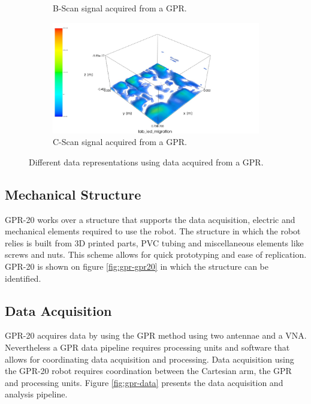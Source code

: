 \documentclass{article}
\begin{document}
\begin{figure}
\begin{subfigure}[b]{0.4\textwidth}
        \caption{B-Scan signal acquired from a GPR.}
        \label{fig:gpr-b-scan}
    \end{subfigure}
    \vfill
    \begin{subfigure}[b]{0.6\textwidth}
        \centering
        \includegraphics[width=\textwidth]{images/C_Scan_sample.jpeg}
        \caption{C-Scan signal acquired from a GPR.}
        \label{fig:gpr-c-scan}
    \end{subfigure}
    \caption{Different data representations using data acquired from a GPR.}
    \label{fig:gpr-scans}
\end{figure}


\subsection{Mechanical Structure}
GPR-20 works over a structure that supports the data acquisition, electric and mechanical elements required to use the robot. The structure in which the robot relies is built from 3D printed parts, PVC tubing and miscellaneous elements like screws and nuts. This scheme allows for quick prototyping and ease of replication. GPR-20 is shown on figure \ref{fig:gpr-gpr20} in which the structure can be identified. 


\subsection{Data Acquisition}
GPR-20 acquires data by using the GPR method using two antennae and a VNA. Nevertheless a GPR data pipeline requires processing units and software that allows for coordinating data acquisition and processing. Data acquisition using the GPR-20 robot requires coordination between the Cartesian arm, the GPR and processing units. Figure \ref{fig:gpr-data} presents the data acquisition and analysis pipeline.
\end{document}
